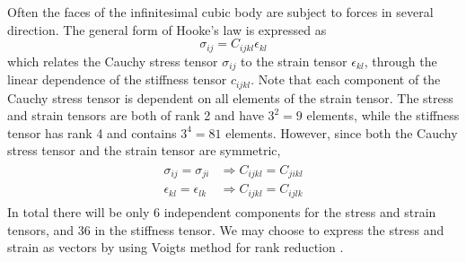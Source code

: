 \documentclass[twoside,english]{uiofysmaster}
\begin{document}
Often the faces of the infinitesimal cubic body are subject to forces in several direction. 
The general form of Hooke's law is expressed as
\begin{equation}
	\sigma_{ij} = C_{ijkl}\epsilon_{kl}
\end{equation}
which relates the Cauchy stress tensor $\sigma_{ij}$ to the strain tensor $\epsilon_{kl}$, through the linear dependence of the stiffness tensor $c_{ijkl}$.
Note that each component of the Cauchy stress tensor is dependent on all elements of the strain tensor. 
The stress and strain tensors are both of rank 2 and have $3^2=9$ elements, while the stiffness tensor has rank 4 and contains $3^4=81$ elements.
However, since both the Cauchy stress tensor and the strain tensor are symmetric, 
\begin{align}
\begin{split}
	\sigma_{ij} = \sigma_{ji} &\Rightarrow C_{ijkl} = C_{jikl}\\
	\epsilon_{kl} = \epsilon_{lk} &\Rightarrow C_{ijkl} = C_{ijlk}
\end{split}
\end{align}
In total there will be only 6 independent components for the stress and strain tensors, and 36 in the stiffness tensor. 
We may choose to express the stress and strain as vectors by using Voigts method for rank reduction \cite{Voigt}.
\end{document}
